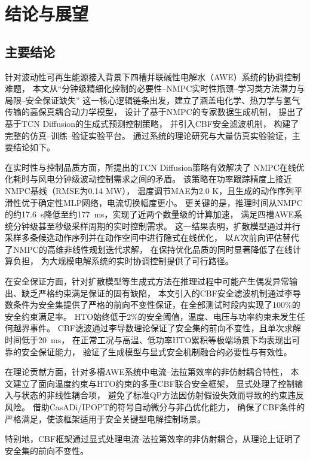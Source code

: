 
\chapter{结论与展望}

\section{主要结论}

针对波动性可再生能源接入背景下四槽并联碱性电解水（AWE）系统的协调控制难题，
本文从``分钟级精细化控制的必要性--NMPC实时性瓶颈--学习类方法潜力与局限--安全保证缺失''
这一核心逻辑链条出发，建立了涵盖电化学、热力学与氢气传输的高保真耦合动力学模型，
设计了基于NMPC的专家数据生成机制，
提出了基于TCN Diffusion的生成式预测控制策略，
并引入CBF安全滤波机制，
构建了完整的仿真--训练--验证实验平台。
通过系统的理论研究与大量仿真实验验证，主要结论如下。

在实时性与控制品质方面，所提出的TCN Diffusion策略有效解决了
NMPC在线优化耗时与风电分钟级波动控制需求之间的矛盾。
该策略在功率跟踪精度上接近NMPC基线（RMSE为0.14 MW），
温度调节MAE为2.0 K，且生成的动作序列平滑性优于确定性MLP网络，电流切换幅度更小。
更关键的是，推理时间从NMPC的约17.6~s降低至约177~ms，实现了近两个数量级的计算加速，
满足四槽AWE系统分钟级甚至秒级采样周期的实时控制需求。
这一结果表明，扩散模型通过并行采样多条候选动作序列并在动作空间中进行隐式在线优化，
以$K$次前向评估替代了NMPC的高维非线性规划迭代求解，
在保持优化品质的同时显著降低了在线计算负担，
为大规模电解系统的实时协调控制提供了可行路径。

在安全保证方面，针对扩散模型等生成式方法在推理过程中可能产生偶发异常输出、缺乏严格约束满足保证的固有缺陷，
本文引入的CBF安全滤波机制通过李导数条件为安全集提供了严格的前向不变性保证，在全部测试时段内实现了100\%的安全约束满足率。
HTO始终低于2\%的安全阈值，温度、电压与功率约束未发生任何越界事件。
CBF滤波通过李导数理论保证了安全集的前向不变性，且单次求解时间低于20~ms，
在正常工况与高温、低功率HTO累积等极端场景下均表现出可靠的安全保证能力，
验证了生成模型与显式安全机制融合的必要性与有效性。

在理论贡献方面，针对多槽AWE系统中电流--法拉第效率的非仿射耦合特性，
本文建立了面向温度约束与HTO约束的多重CBF联合安全框架，
显式处理了控制输入与状态的非线性耦合项，
避免了标准QP方法因仿射假设失效而导致的约束违反风险。
借助CasADi/IPOPT的符号自动微分与非凸优化能力，
确保了CBF条件的严格满足，使该框架适用于安全关键型电解控制场景。

特别地，CBF框架通过显式处理电流-法拉第效率的非仿射耦合，从理论上证明了安全集的前向不变性。

